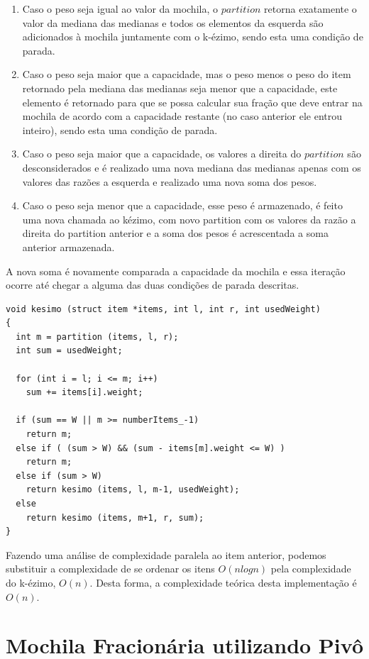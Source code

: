 \documentclass[
	12pt,				%
	oneside,			%
	a4paper,			%
	english,			%
	french,				%
	spanish,			%
	brazil,				%
	]{abntex2}
\begin{document}
\begin{enumerate}
    \item Caso o peso seja igual ao valor da mochila, o $partition$ retorna exatamente o valor da mediana das medianas e todos os elementos da esquerda são adicionados à mochila juntamente com o k-ézimo, sendo esta uma condição de parada.
    \item Caso o peso seja maior que a capacidade, mas o peso menos o peso do item retornado pela mediana das medianas seja menor que a capacidade, este elemento é retornado para que se possa calcular sua fração que deve entrar na mochila de acordo com a capacidade restante (no caso anterior ele entrou inteiro), sendo esta uma condição de parada.
    \item Caso o peso seja maior que a capacidade, os valores a direita do $partition$ são desconsiderados e é realizado uma nova mediana das medianas apenas com os valores das razões a esquerda e realizado uma nova soma dos pesos.
    \item Caso o peso seja menor que a capacidade, esse peso é armazenado, é feito uma nova chamada ao kézimo, com novo partition com os valores da razão a direita do partition anterior e a soma dos pesos é acrescentada a soma anterior armazenada.
\end{enumerate}
A nova soma é novamente comparada a capacidade da mochila e essa iteração ocorre até chegar a alguma das duas condições de parada descritas.

\begin{lstlisting}[mathescape=true, label=medianadasmedianas]
void kesimo (struct item *items, int l, int r, int usedWeight)
{
  int m = partition (items, l, r);
  int sum = usedWeight;

  for (int i = l; i <= m; i++)
    sum += items[i].weight;
    
  if (sum == W || m >= numberItems_-1)  
    return m;  
  else if ( (sum > W) && (sum - items[m].weight <= W) )  
    return m;  
  else if (sum > W)
    return kesimo (items, l, m-1, usedWeight);  
  else  
    return kesimo (items, m+1, r, sum);  
}
\end{lstlisting}


Fazendo uma análise de complexidade paralela ao item anterior, podemos substituir a complexidade de se ordenar os itens $O(nlogn)$ pela complexidade do k-ézimo, $O(n)$. Desta forma, a complexidade teórica desta implementação é $O(n)$.  


\section{Mochila Fracionária utilizando Pivô}
\end{document}
